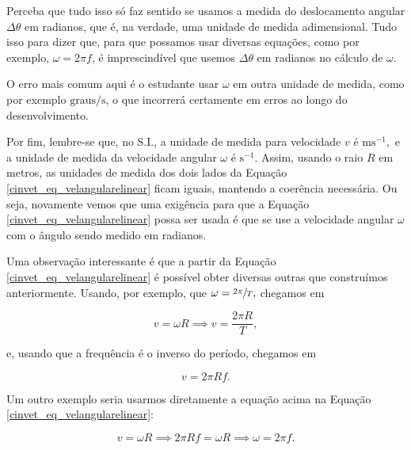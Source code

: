 Perceba que tudo isso só faz sentido se usamos a medida do deslocamento angular $\Delta \theta$ em radianos, que é, na verdade, uma unidade de medida adimensional. Tudo isso para dizer que, para que possamos usar diversas equações, como por exemplo, $\omega = 2 \pi f$, é imprescindível que usemos $\Delta \theta$ em radianos no cálculo de $\omega.$

O erro mais comum aqui é o estudante usar $\omega$ em outra unidade de medida, como por exemplo $\text{graus}/\text{s}$, o que incorrerá certamente em erros ao longo do desenvolvimento.


Por fim, lembre-se que, no S.I., a unidade de medida para velocidade $v$ é $\text{m}\text{s}^{-1},$ e a unidade de medida da velocidade angular $\omega$ é $\text{s}^{-1}.$ Assim, usando o raio $R$ em metros, as unidades de medida dos dois lados da Equação \eqref{cinvet_eq_velangularelinear} ficam iguais, mantendo a coerência necessária. Ou seja, novamente vemos que uma exigência para que a Equação \eqref{cinvet_eq_velangularelinear} possa ser usada é que se use a velocidade angular $\omega$ com o ângulo sendo medido em radianos.



Uma observação interessante é que a partir da Equação \eqref{cinvet_eq_velangularelinear} é possível obter diversas outras que construímos anteriormente. Usando, por exemplo, que $\omega = \sfrac{2 \pi}{T},$ chegamos em

$$  v = \omega R \implies v = \dfrac{2 \pi R}{T},$$

\noindent e, usando que a frequência é o inverso do período, chegamos em

$$ \boxed{v = 2 \pi R f.}$$

Um outro exemplo seria usarmos diretamente a equação acima na Equação \eqref{cinvet_eq_velangularelinear}:


$$  v = \omega R \implies 2 \pi R f = \omega R \implies \boxed{\omega = 2 \pi f.}$$


\vspace{0.3cm}


